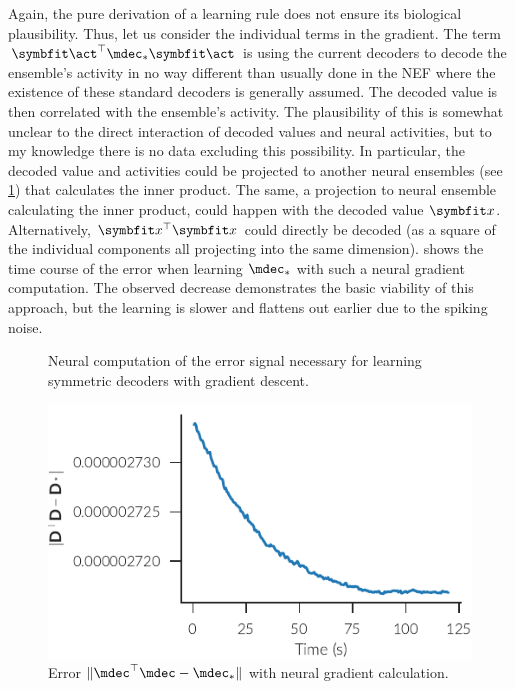 Again, the pure derivation of a learning rule does not ensure its biological plausibility.
Thus, let us consider the individual terms in the gradient.
The term $\vc\act\Tr \mdec_* \vc\act$ is using the current decoders to decode the ensemble's activity in no way different than usually done in the NEF where the existence of these standard decoders is generally assumed.
The decoded value is then correlated with the ensemble's activity.
The plausibility of this is somewhat unclear to the direct interaction of decoded values and neural activities, but to my knowledge there is no data excluding this possibility.
In particular, the decoded value and activities could be projected to another neural ensembles (see \cref{fig:aml-grad-desc}) that calculates the inner product.
The same, a projection to neural ensemble calculating the inner product, could happen with the decoded value $\vc x$.
Alternatively, $\vc x\Tr \vc x$ could directly be decoded (as a square of the individual components all projecting into the same dimension).
 shows the time course of the error when learning $\mdec_*$ with such a neural gradient computation.
The observed decrease demonstrates the basic viability of this approach, but the learning is slower and flattens out earlier due to the spiking noise.
\begin{figure}
    \centering
    \caption{Neural computation of the error signal necessary for learning symmetric decoders with gradient descent.}\label{fig:aml-grad-desc}
\end{figure}
\begin{figure}
    \centering
    \includegraphics{figures/aml-neural-grad-err}
    \caption{Error $\lVert \mdec\Tr\mdec - \mdec_*\rVert$ with neural gradient calculation.}\label{fig:aml:neural-grad-err}
\end{figure}



